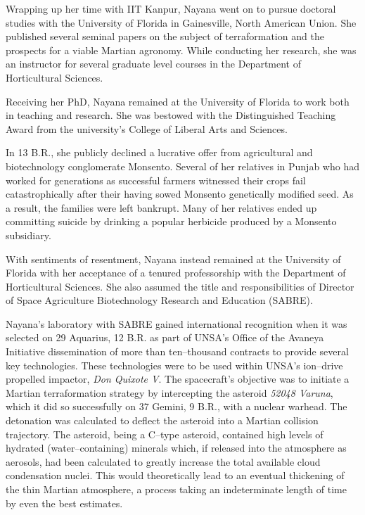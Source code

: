 Wrapping up her time with IIT Kanpur, Nayana went on to pursue doctoral studies with the University of Florida in Gainesville, North American Union. She published several seminal papers on the subject of terraformation and the prospects for a viable Martian agronomy. While conducting her research, she was an instructor for several graduate level courses in the Department of Horticultural Sciences.

Receiving her PhD, Nayana remained at the University of Florida to work both in teaching and research. She was bestowed with the Distinguished Teaching Award from the university's College of Liberal Arts and Sciences. 

In 13 B.R., she publicly declined a lucrative offer from agricultural and biotechnology conglomerate Monsento. Several of her relatives in Punjab who had worked for generations as successful farmers witnessed their crops fail catastrophically after their having sowed Monsento genetically modified seed. As a result, the families were left bankrupt. Many of her relatives ended up committing suicide by drinking a popular herbicide produced by a Monsento subsidiary. 

With sentiments of resentment, Nayana instead remained at the University of Florida with her acceptance of a tenured professorship with the Department of Horticultural Sciences. She also assumed the title and responsibilities of Director of Space Agriculture Biotechnology Research and Education (SABRE).

Nayana's laboratory with SABRE gained international recognition when it was selected on 29 Aquarius, 12 B.R. as part of UNSA's Office of the Avaneya Initiative dissemination of more than ten--thousand contracts to provide several key technologies. These technologies were to be used within UNSA's ion--drive propelled impactor, {\it Don Quixote V}. The spacecraft's objective was to initiate a Martian terraformation strategy by intercepting the asteroid {\it 52048 Varuna}, which it did so successfully on 37 Gemini, 9 B.R., with a nuclear warhead. The detonation was calculated to deflect the asteroid into a Martian collision trajectory. The asteroid, being a C--type asteroid, contained high levels of hydrated (water--containing) minerals which, if released into the atmosphere as aerosols, had been calculated to greatly increase the total available cloud condensation nuclei. This would theoretically lead to an eventual thickening of the thin Martian atmosphere, a process taking an indeterminate length of time by even the best estimates.

